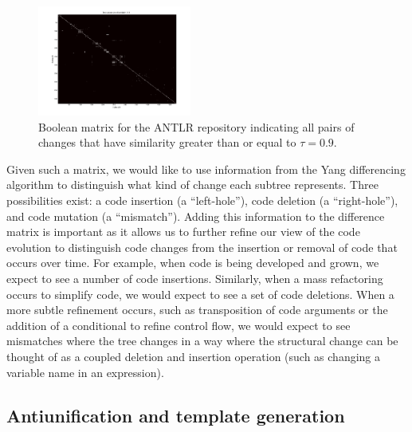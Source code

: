 \begin{figure}
\begin{center}
\includegraphics[width=0.45\textwidth]{figures/distmatrix-0-9.png}
\caption{Boolean matrix for the ANTLR repository indicating all pairs of
changes that have similarity greater than or equal to $\tau = 0.9$.}
\label{fig:boolmat}
\end{center}
\end{figure}

Given such a matrix, we would like to use information from the Yang
differencing algorithm to distinguish what kind of change each subtree
represents.  Three possibilities exist: a code insertion (a ``left-hole''),
code deletion (a ``right-hole''), and code mutation (a ``mismatch'').  Adding
this information to the difference matrix is important as it allows us to
further refine our view of the code evolution to distinguish code changes from
the insertion or removal of code that occurs over time. For example, when code
is being developed and grown, we expect to see a number of code insertions.
Similarly, when a mass refactoring occurs to simplify code, we would expect to
see a set of code deletions.  When a more subtle refinement occurs, such as
transposition of  code arguments or the addition of a conditional to refine
control flow, we would expect to see mismatches where the tree changes in a way
where the structural change can be thought of as a  coupled deletion and
insertion operation (such as changing a variable name in an expression).

\subsection{Antiunification and template generation}

